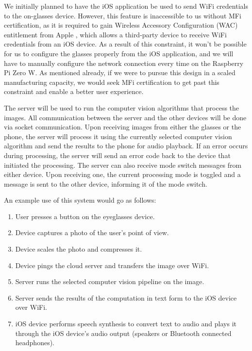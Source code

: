 \documentclass[a4paper,11pt]{article}
\begin{document}
We initially planned to have the iOS application be used to send WiFi credentials to the on-glasses device. However, this feature is inaccessible to us without MFi certification, as it is required to gain Wireless Accessory Configuration (WAC) entitlement from Apple \cite{apple-wac}, which allows a third-party device to receive WiFi credentials from an iOS device. As a result of this constraint, it won't be possible for us to configure the glasses properly from the iOS application, and we will have to manually configure the network connection every time on the Raspberry Pi Zero W. As mentioned already, if we were to pursue this design in a scaled manufacturing capacity, we would seek MFi certification to get past this constraint and enable a better user experience.

The server will be used to run the computer vision algorithms that process the images. All communication between the server and the other devices will be done via socket communication. Upon receiving images from either the glasses or the phone, the server will process it using the currently selected computer vision algorithm and send the results to the phone for audio playback. If an error occurs during processing, the server will send an error code back to the device that initiated the processing. The server can also receive mode switch messages from either device. Upon receiving one, the current processing mode is toggled and a message is sent to the other device, informing it of the mode switch.

An example use of this system would go as follows:
\begin{enumerate}
    \item User presses a button on the eyeglasses device.
    \item Device captures a photo of the user's point of view.
    \item Device scales the photo and compresses it.
    \item Device pings the cloud server and transfers the image over WiFi.
    \item Server runs the selected computer vision pipeline on the image.
    \item Server sends the results of the computation in text form to the iOS device over WiFi.
    \item iOS device performs speech synthesis to convert text to audio and plays it through the iOS device's audio output (speakers or Bluetooth connected headphones).
\end{enumerate}
\end{document}
